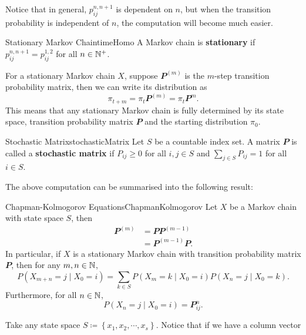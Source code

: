 \documentclass[math, code]{amznotes}
\theoremstyle{remark}
\begin{document}
Notice that in general, $p_{ij}^{n, n + 1}$ is dependent on $n$, but when the transition probability is independent of $n$, the computation will become much easier.
\begin{dfnbox}{Stationary Markov Chain}{timeHomo}
    A Markov chain is {\color{red} \textbf{stationary}} if $p_{ij}^{n, n + 1} = p_{ij}^{1, 2}$ for all $n \in \mathbb{N}^+$.
\end{dfnbox}
For a stationary Markov chain $X$, suppose $\mathbfit{P}^{\left(m\right)}$ is the $m$-step transition probability matrix, then we can write its distribution as 
\begin{equation*}
    \pi_{t + m} = \pi_t\mathbfit{P}^{\left(m\right)} = \pi_t\mathbfit{P}^{m}.
\end{equation*}
This means that any stationary Markov chain is fully determined by its state space, transition probability matrix $\mathbfit{P}$ and the starting distribution $\pi_0$.
\begin{dfnbox}{Stochastic Matrix}{stochasticMatrix}
    Let $S$ be a countable index set. A matrix $\mathbfit{P}$ is called a {\color{red} \textbf{stochastic matrix}} if $P_{ij} \geq 0$ for all $i, j \in S$ and $\sum_{j \in S}P_{ij} = 1$ for all $i \in S$.
\end{dfnbox}
The above computation can be summarised into the following result:
\begin{thmbox}{Chapman-Kolmogorov Equations}{ChapmanKolmogorov}
    Let $X$ be a Markov chain with state space $S$, then 
    \begin{align*}
        \mathbfit{P}^{\left(m\right)} & = \mathbfit{P}\mathbfit{P}^{\left(m - 1\right)} \\
        & = \mathbfit{P}^{\left(m - 1\right)}\mathbfit{P}.
    \end{align*}
    In particular, if $X$ is a stationary Markov chain with transition probability matrix $\mathbfit{P}$, then for any $m, n \in \mathbb{N}$, 
    \begin{equation*}
        P\left(X_{m + n} = j \mid X_0 = i\right) = \sum_{k \in S}P\left(X_m = k \mid X_0 = i\right)P\left(X_n = j \mid X_0 = k\right).
    \end{equation*}
    Furthermore, for all $n \in \mathbb{N}$,\
    \begin{equation*}
        P\left(X_n = j \mid X_0 = i\right) = \mathbfit{P}^n_{ij}.
    \end{equation*}
\end{thmbox}
Take any state space $S \coloneqq \left\{x_1, x_2, \cdots, x_s\right\}$. Notice that if we have a column vector 
\end{document}
